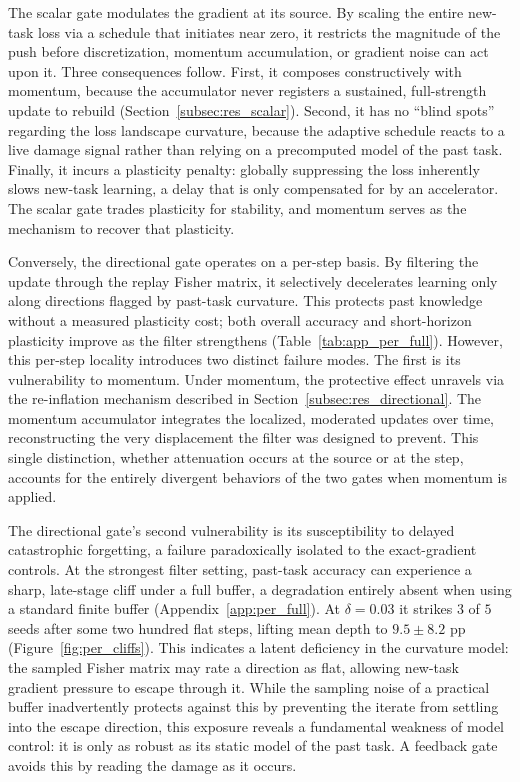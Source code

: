 The scalar gate modulates the gradient at its source. By scaling the entire new-task loss via a schedule that initiates near zero, it restricts the magnitude of the push before discretization, momentum accumulation, or gradient noise can act upon it. Three consequences follow. First, it composes constructively with momentum, because the accumulator never registers a sustained, full-strength update to rebuild (Section~\ref{subsec:res_scalar}). Second, it has no ``blind spots'' regarding the loss landscape curvature, because the adaptive schedule reacts to a live damage signal rather than relying on a precomputed model of the past task. Finally, it incurs a plasticity penalty: globally suppressing the loss inherently slows new-task learning, a delay that is only compensated for by an accelerator. The scalar gate trades plasticity for stability, and momentum serves as the mechanism to recover that plasticity.

Conversely, the directional gate operates on a per-step basis. By filtering the update through the replay Fisher matrix, it selectively decelerates learning only along directions flagged by past-task curvature. This protects past knowledge without a measured plasticity cost; both overall accuracy and short-horizon plasticity improve as the filter strengthens (Table~\ref{tab:app_per_full}). However, this per-step locality introduces two distinct failure modes. The first is its vulnerability to momentum. Under momentum, the protective effect unravels via the re-inflation mechanism described in Section~\ref{subsec:res_directional}. The momentum accumulator integrates the localized, moderated updates over time, reconstructing the very displacement the filter was designed to prevent. This single distinction, whether attenuation occurs at the source or at the step, accounts for the entirely divergent behaviors of the two gates when momentum is applied.

The directional gate's second vulnerability is its susceptibility to delayed catastrophic forgetting, a failure paradoxically isolated to the exact-gradient controls. At the strongest filter setting, past-task accuracy can experience a sharp, late-stage cliff under a full buffer, a degradation entirely absent when using a standard finite buffer (Appendix~\ref{app:per_full}). At $\delta = 0.03$ it strikes $3$ of $5$ seeds after some two hundred flat steps, lifting mean depth to $9.5 \pm 8.2$ pp (Figure~\ref{fig:per_cliffs}). This indicates a latent deficiency in the curvature model: the sampled Fisher matrix may rate a direction as flat, allowing new-task gradient pressure to escape through it. While the sampling noise of a practical buffer inadvertently protects against this by preventing the iterate from settling into the escape direction, this exposure reveals a fundamental weakness of model control: it is only as robust as its static model of the past task. A feedback gate avoids this by reading the damage as it occurs.


